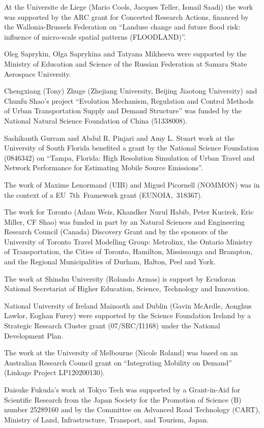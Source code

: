 At the Universite de Liege (Mario Cools, Jacques Teller, Ismail Saadi) the work was supported by the ARC grant for Concerted Research Actions, financed by the Wallonia-Brussels Federation on ``Landuse change and future flood risk: influence of micro-scale spatial patterns (FLOODLAND)''.

Oleg Saprykin, Olga Saprykina and Tatyana Mikheeva were supported by the Ministry of Education and Science of the Russian Federation at Samara State Aerospace University. 

Chengxiang (Tony) Zhuge (Zhejiang University, Beijing Jiaotong University) and Chunfu Shao’s project ``Evolution Mechanism, Regulation and Control Methods of Urban Transportation Supply and Demand Structure'' was funded by the National Natural Science Foundation of China (51338008).

Sashikanth Gurram and Abdul R. Pinjari and Amy L. Stuart work at the University of South Florida benefited a grant by the National Science Foundation (0846342) on ``Tampa, Florida: High Resolution Simulation of Urban Travel and Network Performance for Estimating Mobile Source Emissions''.

The work of Maxime Lenormand (UIB) and Miguel Picornell (NOMMON) was in the context of a EU~7th~Framework grant (EUNOIA,~318367).
 
The work for Toronto (Adam Weis, Khandker Nurul Habib, Peter Kucirek, Eric Miller, CF Shao) was funded in part by an Natural Sciences and Engineering Research Council (Canada) Discovery Grant and by the sponsors of the University of Toronto Travel Modelling Group: Metrolinx, the Ontario Ministry of Transportation, the Cities of Toronto, Hamilton, Mississauga and Brampton, and the Regional Municipalities of Durham, Halton, Peel and York.

The work at Shinshu University (Rolando Armas) is support by Ecudoran National Secretariat of Higher Education, Science, Technology and Innovation. 

National University of Ireland Mainooth and Dublin (Gavin McArdle, Aonghus Lawlor, Eoghan Furey) were supported by the Science Foundation Ireland by a Strategic Research Cluster grant (07/SRC/I1168) under the National Development Plan.

The work at the University of Melbourne (Nicole Roland) was based on an Australian Research Council grant on ``Integrating Mobility on Demand'' (Linkage Project LP120200130).

Daisuke Fukuda's work at Tokyo Tech was supported by a Grant-in-Aid for Scientific Research from the Japan Society for the Promotion of Science (B) number 25289160 and by the Committee on Advanced Road Technology (CART), Ministry of Land, Infrastructure, Transport, and Tourism, Japan.

